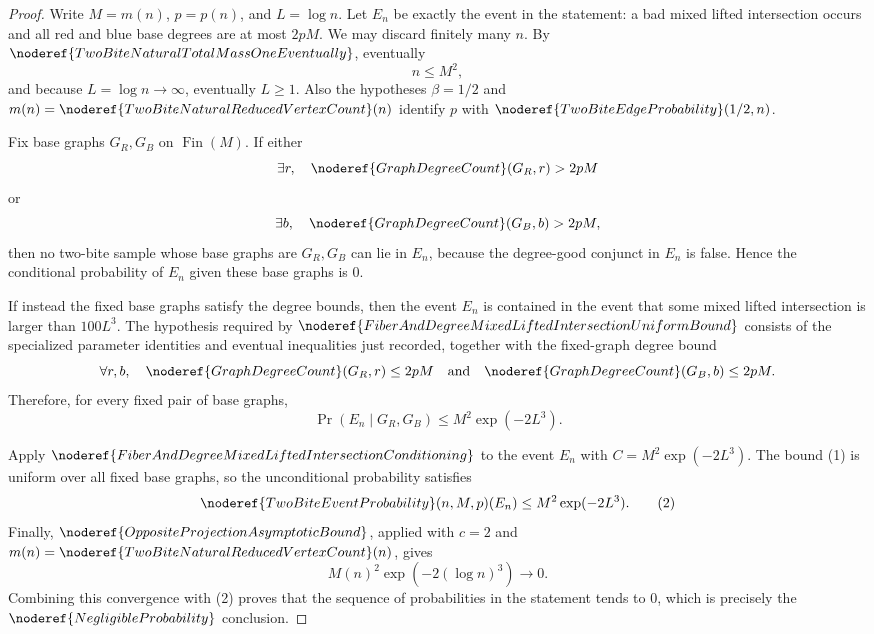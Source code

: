 \begin{proof}
Write \(M=m(n)\), \(p=p(n)\), and \(L=\log n\).  Let \(E_n\) be exactly the
event in the statement: a bad mixed lifted intersection occurs and all red
and blue base degrees are at most \(2pM\).
We may discard finitely many \(n\).  By
\(\noderef{TwoBiteNaturalTotalMassOneEventually}\), eventually
\[
n\le M^2,
\]
and because \(L=\log n\to\infty\), eventually \(L\ge1\).  Also the hypotheses
\(\beta=1/2\) and \(m(n)=\noderef{TwoBiteNaturalReducedVertexCount}(n)\)
identify \(p\) with \(\noderef{TwoBiteEdgeProbability}(1/2,n)\).

Fix base graphs \(G_R,G_B\) on \(\operatorname{Fin}(M)\).  If either
\[
\exists r,\quad \noderef{GraphDegreeCount}(G_R,r)>2pM
\]
or
\[
\exists b,\quad \noderef{GraphDegreeCount}(G_B,b)>2pM,
\]
then no two-bite sample whose base graphs are \(G_R,G_B\) can lie in
\(E_n\), because the degree-good conjunct in \(E_n\) is false.  Hence the
conditional probability of \(E_n\) given these base graphs is \(0\).

If instead the fixed base graphs satisfy the degree bounds, then the event
\(E_n\) is contained in the event that some mixed lifted intersection is
larger than \(100L^3\).  The hypothesis required by
\(\noderef{FiberAndDegreeMixedLiftedIntersectionUniformBound}\) consists of
the specialized parameter identities and eventual inequalities just recorded,
together with the fixed-graph degree bound
\[
\forall r,b,\quad
\noderef{GraphDegreeCount}(G_R,r)\le2pM
\quad\text{and}\quad
\noderef{GraphDegreeCount}(G_B,b)\le2pM.
\]
Therefore, for every fixed pair of base graphs,
\[
\Pr(E_n\mid G_R,G_B)\le M^2\exp(-2L^3).
\tag{1}
\]

Apply \(\noderef{FiberAndDegreeMixedLiftedIntersectionConditioning}\) to the
event \(E_n\) with \(C=M^2\exp(-2L^3)\).  The bound (1) is uniform over all
fixed base graphs, so the unconditional probability satisfies
\[
\noderef{TwoBiteEventProbability}(n,M,p)(E_n)
\le M^2\exp(-2L^3).
\tag{2}
\]
Finally, \(\noderef{OppositeProjectionAsymptoticBound}\), applied with
\(c=2\) and \(m(n)=\noderef{TwoBiteNaturalReducedVertexCount}(n)\), gives
\[
M(n)^2\exp(-2(\log n)^3)\to0.
\]
Combining this convergence with (2) proves that the sequence of probabilities
in the statement tends to \(0\), which is precisely the
\(\noderef{NegligibleProbability}\) conclusion.
\end{proof}
